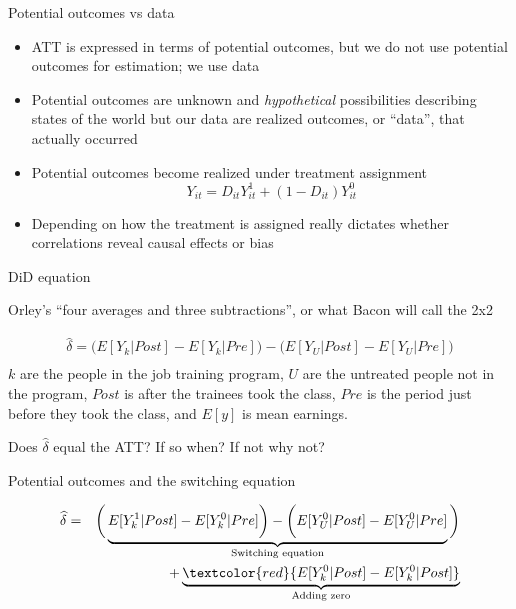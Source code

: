 \documentclass{beamer}
\begin{document}
\begin{frame}{Potential outcomes vs data}

\begin{itemize}
\item ATT is expressed in terms of potential outcomes, but we do not use potential outcomes for estimation; we use data
\item Potential outcomes are unknown and \emph{hypothetical} possibilities describing states of the world but our data are realized outcomes, or ``data'', that actually occurred
\item Potential outcomes become realized under treatment assignment $$Y_{it}=D_{it}Y_{it}^1 + (1-D_{it})Y_{it}^0$$
\item Depending on how the treatment is assigned really dictates whether correlations reveal causal effects or bias

\end{itemize}
\end{frame}




\begin{frame}{DiD equation}

Orley's ``four averages and three subtractions'', or what Bacon will call the 2x2

\begin{eqnarray*}
\widehat{\delta} = \bigg ( E[Y_k|Post] - E[Y_k|Pre] \bigg ) - \bigg ( E[Y_U | Post ] - E[ Y_U | Pre] \bigg) \\
\end{eqnarray*}$k$ are the people in the job training program, $U$ are the untreated people not in the program, $Post$ is after the trainees took the class, $Pre$ is the period just before they took the class, and $E[y]$ is mean earnings. 

\bigskip

Does $\widehat{\delta}$ equal the ATT?  If so when? If not why not?

\end{frame}



\begin{frame}{Potential outcomes and the switching equation}

\begin{eqnarray*}
\widehat{\delta} &=& \bigg ( \underbrace{E[Y^1_k|Post] - E[Y^0_k|Pre] \bigg ) - \bigg ( E[Y^0_U | Post ] - E[ Y^0_U | Pre]}_{\mathclap{\text{Switching equation}}} \bigg)  \\
&&+ \underbrace{\textcolor{red}{E[Y_k^0 |Post] - E[Y^0_k | Post]}}_{\mathclap{\text{Adding zero}}} 
\end{eqnarray*}

\end{frame}
\end{document}
